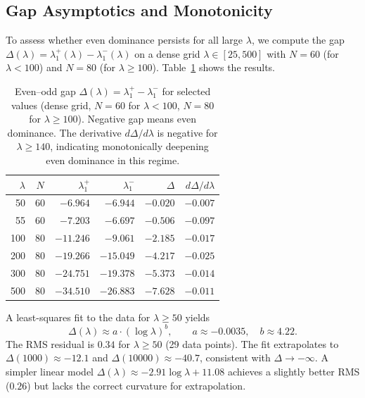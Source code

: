 \documentclass[12pt,a4paper]{article}
\theoremstyle{definition}
\theoremstyle{remark}
\begin{document}
\subsection{Gap Asymptotics and Monotonicity}
\label{sec:gap-asymptotics}

To assess whether even dominance persists for all large $\lambda$, we compute the gap $\Delta(\lambda) = \lambda_1^+(\lambda) - \lambda_1^-(\lambda)$ on a dense grid $\lambda \in [25, 500]$ with $N = 60$ (for $\lambda < 100$) and $N = 80$ (for $\lambda \geq 100$). Table~\ref{tab:gap-asymp} shows the results.

\begin{table}[h]
\centering
\renewcommand{\arraystretch}{1.15}
\begin{tabular}{r|c|r|r|r|r}
$\lambda$ & $N$ & $\lambda_1^+$ & $\lambda_1^-$ & $\Delta$ & $d\Delta/d\lambda$ \\\hline
50  & 60 & $-6.964$ & $-6.944$ & $-0.020$ & $-0.007$ \\
55  & 60 & $-7.203$ & $-6.697$ & $-0.506$ & $-0.097$ \\
100 & 80 & $-11.246$ & $-9.061$ & $-2.185$ & $-0.017$ \\
200 & 80 & $-19.266$ & $-15.049$ & $-4.217$ & $-0.025$ \\
300 & 80 & $-24.751$ & $-19.378$ & $-5.373$ & $-0.014$ \\
500 & 80 & $-34.510$ & $-26.883$ & $-7.628$ & $-0.011$
\end{tabular}
\caption{Even--odd gap $\Delta(\lambda) = \lambda_1^+ - \lambda_1^-$ for selected values (dense grid, $N=60$ for $\lambda < 100$, $N=80$ for $\lambda \geq 100$). Negative gap means even dominance. The derivative $d\Delta/d\lambda$ is negative for $\lambda \geq 140$, indicating monotonically deepening even dominance in this regime.}
\label{tab:gap-asymp}
\end{table}

A least-squares fit to the data for $\lambda \geq 50$ yields
\begin{equation}
\label{eq:gap-fit}
\Delta(\lambda) \approx a \cdot (\log\lambda)^b, \qquad a \approx -0.0035,\quad b \approx 4.22.
\end{equation}
The RMS residual is $0.34$ for $\lambda \geq 50$ (29 data points). The fit extrapolates to $\Delta(1000) \approx -12.1$ and $\Delta(10000) \approx -40.7$, consistent with $\Delta \to -\infty$.
A simpler linear model $\Delta(\lambda) \approx -2.91 \log\lambda + 11.08$ achieves a slightly better RMS ($0.26$) but lacks the correct curvature for extrapolation.
\end{document}

